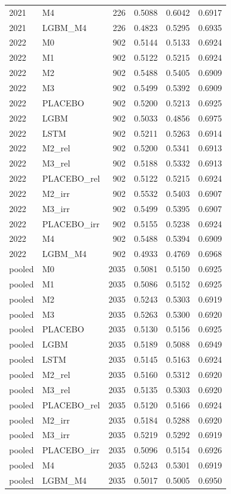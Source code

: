 \begin{tabular}{llrrrr}
2021 & M4 & 226 & 0.5088 & 0.6042 & 0.6917 \\
2021 & LGBM\_M4 & 226 & 0.4823 & 0.5295 & 0.6935 \\
2022 & M0 & 902 & 0.5144 & 0.5133 & 0.6924 \\
2022 & M1 & 902 & 0.5122 & 0.5215 & 0.6924 \\
2022 & M2 & 902 & 0.5488 & 0.5405 & 0.6909 \\
2022 & M3 & 902 & 0.5499 & 0.5392 & 0.6909 \\
2022 & PLACEBO & 902 & 0.5200 & 0.5213 & 0.6925 \\
2022 & LGBM & 902 & 0.5033 & 0.4856 & 0.6975 \\
2022 & LSTM & 902 & 0.5211 & 0.5263 & 0.6914 \\
2022 & M2\_rel & 902 & 0.5200 & 0.5341 & 0.6913 \\
2022 & M3\_rel & 902 & 0.5188 & 0.5332 & 0.6913 \\
2022 & PLACEBO\_rel & 902 & 0.5122 & 0.5215 & 0.6924 \\
2022 & M2\_irr & 902 & 0.5532 & 0.5403 & 0.6907 \\
2022 & M3\_irr & 902 & 0.5499 & 0.5395 & 0.6907 \\
2022 & PLACEBO\_irr & 902 & 0.5155 & 0.5238 & 0.6924 \\
2022 & M4 & 902 & 0.5488 & 0.5394 & 0.6909 \\
2022 & LGBM\_M4 & 902 & 0.4933 & 0.4769 & 0.6968 \\
pooled & M0 & 2035 & 0.5081 & 0.5150 & 0.6925 \\
pooled & M1 & 2035 & 0.5086 & 0.5152 & 0.6925 \\
pooled & M2 & 2035 & 0.5243 & 0.5303 & 0.6919 \\
pooled & M3 & 2035 & 0.5263 & 0.5300 & 0.6920 \\
pooled & PLACEBO & 2035 & 0.5130 & 0.5156 & 0.6925 \\
pooled & LGBM & 2035 & 0.5189 & 0.5088 & 0.6949 \\
pooled & LSTM & 2035 & 0.5145 & 0.5163 & 0.6924 \\
pooled & M2\_rel & 2035 & 0.5160 & 0.5312 & 0.6920 \\
pooled & M3\_rel & 2035 & 0.5135 & 0.5303 & 0.6920 \\
pooled & PLACEBO\_rel & 2035 & 0.5120 & 0.5166 & 0.6924 \\
pooled & M2\_irr & 2035 & 0.5184 & 0.5288 & 0.6920 \\
pooled & M3\_irr & 2035 & 0.5219 & 0.5292 & 0.6919 \\
pooled & PLACEBO\_irr & 2035 & 0.5096 & 0.5154 & 0.6926 \\
pooled & M4 & 2035 & 0.5243 & 0.5301 & 0.6919 \\
pooled & LGBM\_M4 & 2035 & 0.5017 & 0.5005 & 0.6950 \\
\bottomrule
\end{tabular}
